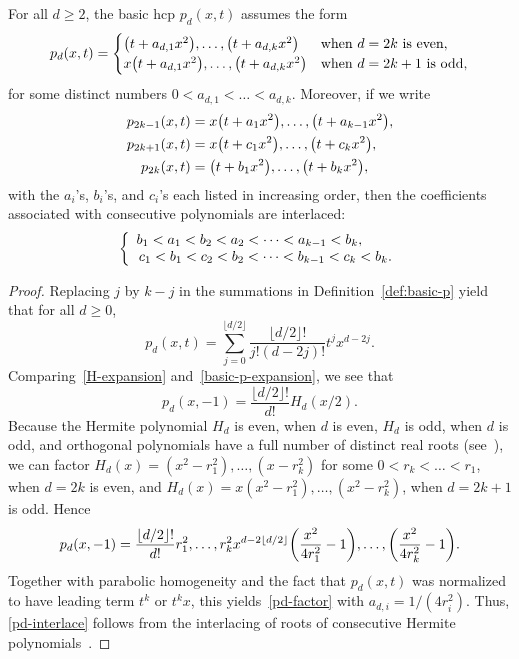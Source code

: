 \documentclass[10pt]{amsart}
\theoremstyle{definition}\newtheorem{defi}[theo]{Definition}\newtheorem{rema}[theo]{Remark}\newtheorem{exam}[theo]{Example}\newtheorem{exem}[theo]{Example}\newtheorem{nota}[theo]{Notation}
\let\originalleft\left
\let\originalright\right
\renewcommand{\left}{\mathopen{}\mathclose\bgroup\originalleft}
\renewcommand{\right}{\aftergroup\egroup\originalright}
\begin{document}
\begin{prop}\label{lem:hcp_dim_1}
For all $d\geq 2$, the basic hcp $p_d(x,t)$ assumes the form
\begin{equation}\label{pd-factor}
p_{d}(x,t) =
\begin{cases}
\left(t+a_{d,1}x^2\right),\dots, \left(t+ a_{d,k}x^2\right) &\text{when $d=2k$ is even},\\
x\left(t+a_{d,1}x^2\right),\dots,\left(t+a_{d,k}x^2\right) & \text{when $d=2k+1$ is odd},
\end{cases}
\end{equation}
for some distinct numbers $0<a_{d,1}<\dots<a_{d,k}$. Moreover, if we write
\begin{align*}
p_{2k-1}(x,t)&=x\left(t+a_1x^2\right),\dots,\left(t+a_{k-1}x^2\right),\\ p_{2k+1}(x,t)&=x\left(t+c_1x^2\right),\dots,\left(t+c_kx^2\right),
\\
p_{2k}(x,t)&=\left(t+b_1x^2\right),\dots,\left(t+b_kx^2\right),
\end{align*}
with the $a_i$\!'s, $b_i$\!'s, and $c_i$\!'s each listed in increasing order, then the coefficients associated with consecutive polynomials are interlaced:
\begin{equation}\label{pd-interlace}
\left\{
\begin{array}{l}
b_1<a_1<b_2<a_2<\dots<a_{k-1}<b_k,\\
\,c_1<b_1<c_2<b_2<\dots<b_{k-1}<c_k<b_k.
\end{array}\right.
\end{equation}
\end{prop}

\begin{proof}
Replacing $j$ by $k-j$ in the summations in Definition~\ref{def:basic-p} yield that for all $d\geq 0$,
\begin{equation}\label{basic-p-expansion}
p_d(x,t)=\sum_{j=0}^{\lfloor d/2\rfloor} \frac{\lfloor d/2\rfloor!}{j!(d-2j)!}t^jx^{d-2j}.
\end{equation}
Comparing~\eqref{H-expansion} and~\eqref{basic-p-expansion}, we see that
\begin{equation}\label{basic-b-vs-H}
p_d(x,-1)=\frac{\lfloor d/2\rfloor!}{d!}H_d(x/2).
\end{equation}
Because the Hermite polynomial $H_d$ is even, when $d$ is even, $H_d$ is odd, when $d$ is odd, and orthogonal polynomials have a full number of distinct real roots (see~\cite[Theorem~3.3.1]{Szego75}), we can factor $H_d(x)=(x^2-r_1^2),\dots,(x-r_k^2)$ for some $0<r_k<\dots<r_1$, when $d=2k$ is even, and $H_d(x)=x(x^2-r_1^2),\dots,(x^2-r_k^2)$, when $d=2k+1$ is odd. Hence
\[
p_d(x,-1)=\frac{\lfloor d/2\rfloor!}{d!}r_1^2,\dots, r_k^2x^{d-2\lfloor d/2\rfloor}\left(\frac{x^2}{4r_1^2}-1\right),\dots,\left(\frac{x^2}{4r_k^2}-1\right).
\]
Together with parabolic homogeneity and the fact that $p_d(x,t)$ was normalized to have leading term $t^k$ or $t^kx$, this yields~\eqref{pd-factor} with $a_{d,i}=1/(4r_i^2)$. Thus, \eqref{pd-interlace} follows from the interlacing of roots of consecutive Hermite polynomials~\cite[Theorem~3.3.2]{Szego75}.
\end{proof}
\end{document}
